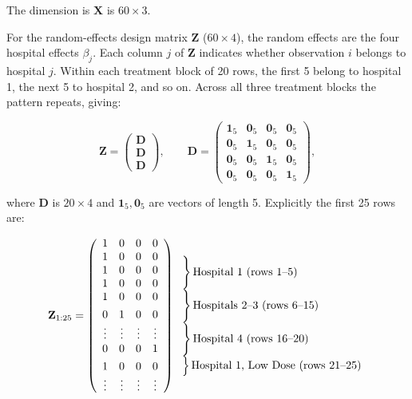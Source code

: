 \documentclass[letterpaper]{article}
\begin{document}
			{The dimension is} $\mathbf{X}$ is $60 \times 3$.
			
			For the {random-effects design matrix $\mathbf{Z}$ ($60 \times 4$)}, the random effects are the four hospital effects $\beta_j$. Each column $j$
			of $\mathbf{Z}$ indicates whether observation $i$ belongs to hospital $j$.
			Within each treatment block of 20 rows, the first 5 belong to hospital 1,
			the next 5 to hospital 2, and so on. Across all three treatment blocks the
			pattern repeats, giving:
			
			\[
			\mathbf{Z} =
			\begin{pmatrix}
				\mathbf{D} \\
				\mathbf{D} \\
				\mathbf{D}
			\end{pmatrix}, \qquad
			\mathbf{D} =
			\begin{pmatrix}
				\mathbf{1}_5 & \mathbf{0}_5 & \mathbf{0}_5 & \mathbf{0}_5 \\
				\mathbf{0}_5 & \mathbf{1}_5 & \mathbf{0}_5 & \mathbf{0}_5 \\
				\mathbf{0}_5 & \mathbf{0}_5 & \mathbf{1}_5 & \mathbf{0}_5 \\
				\mathbf{0}_5 & \mathbf{0}_5 & \mathbf{0}_5 & \mathbf{1}_5
			\end{pmatrix},
			\]
			
			where $\mathbf{D}$ is $20\times 4$ and $\mathbf{1}_5, \mathbf{0}_5$ are
			vectors of length 5. Explicitly the first 25 rows are:
			
		\[
		\mathbf{Z}_{1:25} = \left(
		\begin{array}{cccc}
			1 & 0 & 0 & 0 \\
			1 & 0 & 0 & 0 \\
			1 & 0 & 0 & 0 \\
			1 & 0 & 0 & 0 \\
			1 & 0 & 0 & 0 \\[4pt]
			0 & 1 & 0 & 0 \\
			\vdots & \vdots & \vdots & \vdots \\
			0 & 0 & 0 & 1 \\[4pt]
			1 & 0 & 0 & 0 \\
			\vdots & \vdots & \vdots & \vdots
		\end{array}
		\right)
		\begin{array}{l}
			\left.\rule{0pt}{3.8ex}\right\} \text{Hospital 1 (rows 1--5)} \\[4pt]
			\left.\rule{0pt}{3.8ex}\right\} \text{Hospitals 2--3 (rows 6--15)} \\[4pt]
			\left.\rule{0pt}{3.8ex}\right\} \text{Hospital 4 (rows 16--20)} \\[4pt]
			\left.\rule{0pt}{2.5ex}\right\} \text{Hospital 1, Low Dose (rows 21--25)}
		\end{array}
		\]
			
\end{document}

